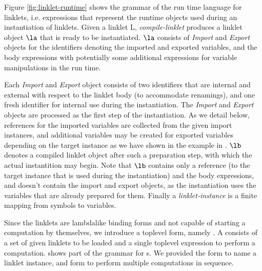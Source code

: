 Figure \ref{fig:linklet-runtime} shows the grammar of the run\dash
time language for linklets, i.e. expressions that represent the
run\dash time objects used during an instantiation of linklets. Given a
linklet L, \emph{compile-linklet} produces a linklet object $\la$ that
is ready to be instantiated. $\la$ consists of \emph{Import} and
\emph{Export} objects for the identifiers denoting the imported and
exported variables, and the body expressions with potentially some
additional expressions for variable manipulations in the run\dash
time.

Each \emph{Import} and \emph{Export} object consists of two
identifiers that are internal and external with respect to the linklet
body (to accommodate renamings), and one fresh identifier for internal
use during the instantiation. The \emph{Import} and \emph{Export}
objects are processed as the first step of the instantiation. As we
detail below, references for the imported variables are collected from
the given import instances, and additional variables may be created
for exported variables depending on the target instance as we have
shown in the example in . $\lb$
denotes a compiled linklet object after such a preparation step, with
which the actual instantition may begin. Note that $\lb$ contains only
a reference (to the target instance that is used during the
instantiation) and the body expressions, and doesn't contain the
import and export objects, as the instantiation uses the variables
that are already prepared for them. Finally
a \emph{linklet-instance} is a finite mapping from symbols to
variables.

Since the linklets are lambda\dash like binding forms and not capable
of starting a computation by themselves, we introduce a top\dash level
form, namely . A  consists of
a set of given linklets to be loaded and a single top\dash level
expression to perform a computation. 
shows part of the grammar for s. We provided
the  form to name a linklet instance,
and  form to perform multiple computations in
sequence.

